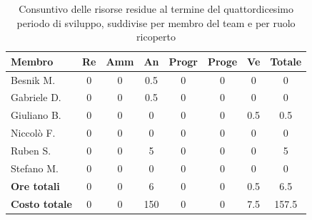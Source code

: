 \documentclass[a4paper,10pt]{article}
\begin{document}
\begin{table}[H]
  \centering
  \begin{tabular}{|l|c|c|c|c|c|c|c|}
    \hline
    \textbf{Membro} & \textbf{Re} & \textbf{Amm} & \textbf{An} & \textbf{Progr} & \textbf{Proge} & \textbf{Ve} & \textbf{Totale} \\
    \hline
    Besnik M.   & 0   & 0   & 0.5 & 0 & 0 & 0   & 0  \\
    Gabriele D. & 0   & 0   & 0.5 & 0 & 0 & 0 & 0 \\
    Giuliano B. & 0   & 0 & 0 & 0 & 0 & 0.5   & 0.5 \\
    Niccolò F.  & 0   & 0   & 0 & 0 & 0 & 0   & 0   \\
    Ruben S.    & 0   & 0   & 5 & 0 & 0 & 0   & 5  \\
    Stefano M.  & 0   & 0   & 0 & 0 & 0 & 0 & 0 \\
    \hline
    \textbf{Ore totali}   & 0    & 0  & 6    & 0   & 0   & 0.5  & 6.5 \\
    \hline
    \textbf{Costo totale} & 0  & 0  & 150  & 0  & 0  & 7.5 & 157.5 \\
    \hline
  \end{tabular}
  \caption{Consuntivo delle risorse residue al termine del quattordicesimo periodo di sviluppo, suddivise per membro del team e per ruolo ricoperto}
\end{table}
\end{document}
